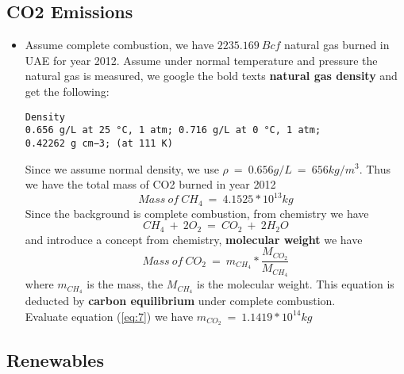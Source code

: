 \documentclass[12pt]{article}
\begin{document}
\subsection{CO2 Emissions}
\label{sec:co2-emissions}

\begin{itemize}
\item Assume complete combustion, we have $2235.169~Bcf$ natural gas
  burned in UAE for year 2012. Assume under normal temperature and
  pressure the natural gas is measured, we google the bold texts
  \textbf{natural gas density} and get the following:
\begin{verbatim}
Density
0.656 g/L at 25 °C, 1 atm; 0.716 g/L at 0 °C, 1 atm;
0.42262 g cm−3; (at 111 K)
\end{verbatim}
  Since we assume normal density, we use $\rho~=~0.656 g/L~=~656
  kg/m^{3}$. Thus we have the total mass of CO2 burned in year 2012
  \begin{equation}
    \label{eq:5}
    Mass~of~CH_{4}~=~4.1525*10^{13} kg
  \end{equation}
  Since the background is complete combustion, from chemistry we have
  \begin{equation}
    \label{eq:6}
    CH_{4}~+~2O_{2}~=~ CO_{2}~+~2H_{2}O
  \end{equation}
  and introduce a concept from chemistry, \textbf{molecular weight} we
  have 
  \begin{equation}
    \label{eq:7}
    Mass~of~CO_{2}~=~m_{CH_{4}}*\frac{M_{CO_{2}}}{M_{CH_{4}}}
  \end{equation}
  where $m_{CH_{4}}$ is the mass, the $M_{CH_{4}}$ is the molecular
  weight. This equation is deducted by \textbf{carbon equilibrium}
  under complete combustion.\\
  Evaluate equation (\ref{eq:7}) we have $m_{CO_{2}}~=~1.1419 *
  10^{14} kg$

\end{itemize}

\subsection{Renewables}
\label{sec:renewables-1}
\end{document}
